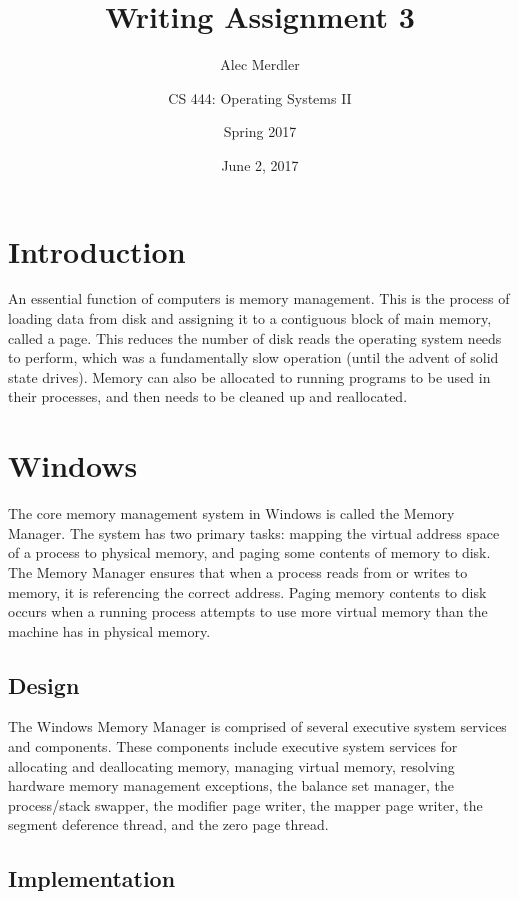 \documentclass[letterpaper,draftclsnofoot,10pt,onecolumn,titlepage]{IEEEtran}\usepackage[margin=0.75in]{geometry}
\title{Writing Assignment 3}
\author{
	Alec Merdler\\
	\and
	CS 444: Operating Systems II\\
	\and
	Spring 2017\\
}
\date{June 2, 2017}
\begin{document}
\begin{titlepage}
\clearpage\maketitle
\thispagestyle{empty}

\maketitle
\end{titlepage}

\section{Introduction}
An essential function of computers is memory management. This is the process of loading data from disk and assigning
it to a contiguous block of main memory, called a page. This reduces the number of disk reads the operating system 
needs to perform, which was a fundamentally slow operation (until the advent of solid state drives). Memory can 
also be allocated to running programs to be used in their processes, and then needs to be cleaned up and 
reallocated.

\section{Windows}
The core memory management system in Windows is called the Memory Manager. The system has two primary tasks: mapping 
the virtual address space of a process to physical memory, and paging some contents of memory to disk. The Memory 
Manager ensures that when a process reads from or writes to memory, it is referencing the correct address. Paging 
memory contents to disk occurs when a running process attempts to use more virtual memory than the machine
has in physical memory.

\subsection{Design}
The Windows Memory Manager is comprised of several executive system services and components. These components 
include executive system services for allocating and deallocating memory, managing virtual 
memory, resolving hardware memory management exceptions, the balance set manager, the process/stack swapper, 
the modifier page writer, the mapper page writer, the segment deference thread, and the zero page thread.

\subsection{Implementation}
\end{document}
